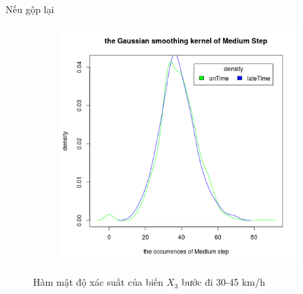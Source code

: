 \documentclass[a4paper, 13pt]{report}
\begin{document}
\FloatBarrier
Nếu gộp lại \\
\FloatBarrier
\begin{figure}[h]
    \begin{subfigure}[b]{0.7\textwidth}
        \includegraphics[width=\textwidth]{DensityMediumStep.png}
    \end{subfigure}
\caption*{Hàm mật độ xác suất của biến $X_3$ bước đi 30-45 km/h}
\end{figure}
\FloatBarrier
\end{document}

